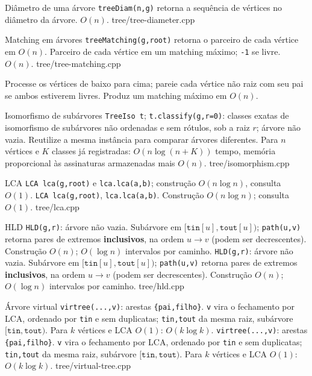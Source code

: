 \ifextended

\templateentry
{Diâmetro de uma árvore}
{}
{\texttt{treeDiam(n,g)} retorna a sequência de vértices no diâmetro da árvore. $O(n)$.}
{tree/tree-diameter.cpp}

\fi

\ifextended
\templateentry
{Matching em árvores}
{\texttt{treeMatching(g,root)} retorna o parceiro de cada vértice em $O(n)$.}
{Parceiro de cada vértice em um matching máximo; \texttt{-1} se livre. $O(n)$.}
{tree/tree-matching.cpp}

\else
{}
{Processe os vértices de baixo para cima; pareie cada vértice não raiz com seu pai se ambos estiverem livres. Produz um matching máximo em $O(n)$.}
{}
\fi

\ifextended

\templateentry
{Isomorfismo de subárvores}
{}
{\texttt{TreeIso t}; \texttt{t.classify(g,r=0)}: classes exatas de isomorfismo de subárvores não ordenadas e sem rótulos, sob a raiz $r$; árvore não vazia. Reutilize a mesma instância para comparar árvores diferentes. Para $n$ vértices e $K$ classes já registradas: $O(n\log(n+K))$ tempo, memória proporcional às assinaturas armazenadas mais $O(n)$.}
{tree/isomorphism.cpp}

\fi

\templateentry
{LCA}
{\texttt{LCA lca(g,root)} e \texttt{lca.lca(a,b)}; construção $O(n \log n)$, consulta $O(1)$.}
{\texttt{LCA lca(g,root)}, \texttt{lca.lca(a,b)}. Construção $O(n\log n)$; consulta $O(1)$.}
{tree/lca.cpp}

\templateentry
{HLD}
{\texttt{HLD(g,r)}: árvore não vazia. Subárvore em $[\mathtt{tin}[u],\mathtt{tout}[u])$; \texttt{path(u,v)} retorna pares de extremos \textbf{inclusivos}, na ordem $u\to v$ (podem ser decrescentes). Construção $O(n)$; $O(\log n)$ intervalos por caminho.}
{\texttt{HLD(g,r)}: árvore não vazia. Subárvore em $[\mathtt{tin}[u],\mathtt{tout}[u])$; \texttt{path(u,v)} retorna pares de extremos \textbf{inclusivos}, na ordem $u\to v$ (podem ser decrescentes). Construção $O(n)$; $O(\log n)$ intervalos por caminho.}
{tree/hld.cpp}

\templateentry
{Árvore virtual}
{\texttt{virtree(...,v)}: arestas \texttt{\{pai,filho\}}. \texttt{v} vira o fechamento por LCA, ordenado por \texttt{tin} e sem duplicatas; \texttt{tin,tout} da mesma raiz, subárvore $[\mathtt{tin},\mathtt{tout})$. Para $k$ vértices e LCA $O(1)$: $O(k\log k)$.}
{\texttt{virtree(...,v)}: arestas \texttt{\{pai,filho\}}. \texttt{v} vira o fechamento por LCA, ordenado por \texttt{tin} e sem duplicatas; \texttt{tin,tout} da mesma raiz, subárvore $[\mathtt{tin},\mathtt{tout})$. Para $k$ vértices e LCA $O(1)$: $O(k\log k)$.}
{tree/virtual-tree.cpp}

